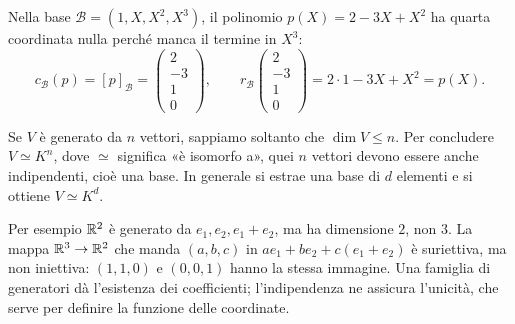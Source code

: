 \begin{esempio}
Nella base $\mathcal B=(1,X,X^2,X^3)$, il polinomio $p(X)=2-3X+X^2$ ha quarta coordinata nulla perché manca il termine in $X^3$:\nopagebreak
\[
 c_{\mathcal B}(p)=[p]_{\mathcal B}=\begin{pmatrix}2\\-3\\1\\0\end{pmatrix},\qquad
 r_{\mathcal B}\!\begin{pmatrix}2\\-3\\1\\0\end{pmatrix}=2\cdot1-3X+X^2=p(X).
\]
\end{esempio}

\begin{osservazione}
Se $V$ è generato da $n$ vettori, sappiamo soltanto che $\dim V\leq n$. Per concludere $V\simeq K^n$, dove $\simeq$ significa «è isomorfo a», quei $n$ vettori devono essere anche indipendenti, cioè una base. In generale si estrae una base di $d$ elementi e si ottiene $V\simeq K^d$.

Per esempio $\mathbb{R}^2$ è generato da $e_1,e_2,e_1+e_2$, ma ha dimensione $2$, non $3$. La mappa $\mathbb{R}^3\to\mathbb{R}^2$ che manda $(a,b,c)$ in $ae_1+be_2+c(e_1+e_2)$ è suriettiva, ma non iniettiva: $(1,1,0)$ e $(0,0,1)$ hanno la stessa immagine. Una famiglia di generatori dà l'esistenza dei coefficienti; l'indipendenza ne assicura l'unicità, che serve per definire la funzione delle coordinate.
\end{osservazione}

